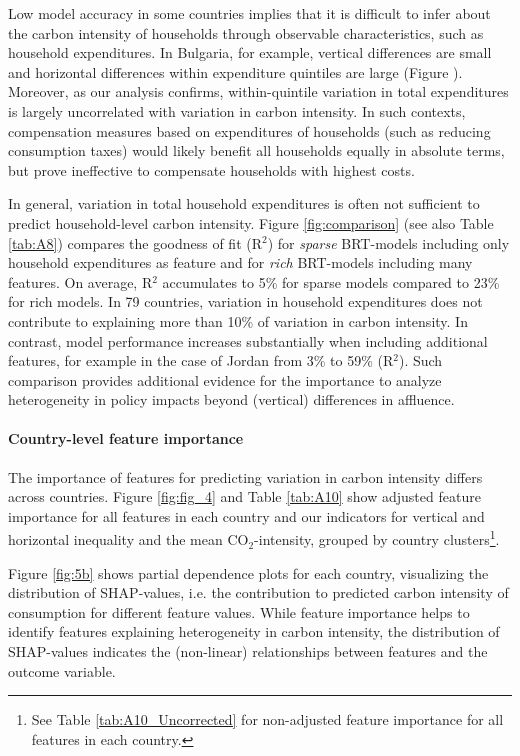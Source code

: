 \documentclass[12pt, a4paper]{article}
\begin{document}
Low model accuracy in some countries implies that it is difficult to infer about the carbon intensity of households through observable characteristics, such as household expenditures. In Bulgaria, for example, vertical differences are small and horizontal differences within expenditure quintiles are large (Figure ). Moreover, as our analysis confirms, within-quintile variation in total expenditures is largely uncorrelated with variation in carbon intensity. In such contexts, compensation measures based on expenditures of households (such as reducing consumption taxes) would likely benefit all households equally in absolute terms, but prove ineffective to compensate households with highest costs. 

In general, variation in total household expenditures is often not sufficient to predict household-level carbon intensity. Figure \ref{fig:comparison} (see also Table \ref{tab:A8}) compares the goodness of fit (R$^{2}$) for \textit{sparse} BRT-models including only household expenditures as feature and for \textit{rich} BRT-models including many features. On average, R$^{2}$ accumulates to 5\% for sparse models compared to 23\% for rich models. In 79 countries, variation in household expenditures does not contribute to explaining more than 10\% of variation in carbon intensity. In contrast, model performance increases substantially when including additional features, for example in the case of Jordan from 3\% to 59\% (R$^{2}$). Such comparison provides additional evidence for the importance to analyze heterogeneity in policy impacts beyond (vertical) differences in affluence.  

\paragraph{Country-level feature importance}
The importance of features for predicting variation in carbon intensity differs across countries. Figure \ref{fig:fig_4} and Table \ref{tab:A10} show adjusted feature importance for all features in each country and our indicators for vertical and horizontal inequality and the mean CO$_{2}$-intensity, grouped by country clusters\footnote{See Table \ref{tab:A10_Uncorrected} for non-adjusted feature importance for all features in each country.}. 

Figure \ref{fig:5b} shows partial dependence plots for each country, visualizing the distribution of SHAP-values, i.e. the contribution to predicted carbon intensity of consumption for different feature values. While feature importance helps to identify features explaining heterogeneity in carbon intensity, the distribution of SHAP-values indicates the (non-linear) relationships between features and the outcome variable.
\end{document}
